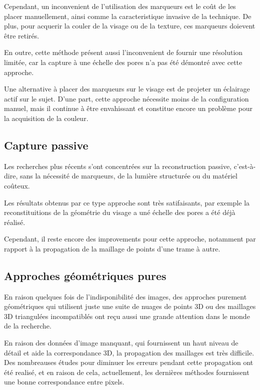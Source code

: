 \documentclass[a4paper,12pt]{article}
\begin{document}
Cependant, un inconvenient de l'utilisation des marqueurs est le coût
de les placer manuellement, ainsi comme la caracteristique invasive de
la technique. De plus, pour acquerir la couler de la visage ou de la
texture, ces marqueurs doievent être retirés. 

En outre, cette méthode présent aussi l'inconvenient de fournir une
résolution limitée, car la capture à une échelle des pores n'a pas été
démontré avec cette approche. 

Une alternative à placer des marqueurs sur le visage est de projeter
un éclairage actif sur le sujet. D'une part, cette approche nécessite
moins de la configuration manuel, mais il continue à être envahissant
et constitue encore un problème pour la acquisition de la couleur. 

\subsection*{Capture passive }

Les recherches plus récents s'ont concentrées sur la reconstruction
passive, c'est-à-dire, sans la nécessité de marqueurs, de la lumière
structurée ou du matériel coûteux. 

Les résultats obtenus par ce type approche sont très satifaisants, par
exemple la reconstituitions de la géométrie du visage a uné échelle
des pores a été déjà réalisé. 
 
Cependant, il reste encore des improvements pour cette approche,
notamment par rapport à la propagation de la maillage de points d'une
trame à autre. 

\subsection*{Approches géométriques pures}

En raison quelques fois de l'indisponibilité des images, des approches purement
géométriques qui utilisent juste une suite de nuages de points 3D ou
des maillages 3D triangulées incompatiblés ont reçu aussi une grande attention
dans le monde de la recherche.

En raison des données d'image manquant, qui fournissent un haut niveau
de détail et aide la correspondance 3D, la propagation des maillages 
est très difficile. Des nombreauses études pour diminuer les erreurs
pendant cette propagation ont été realisé, et en raison de cela,
actuellement, les dernières méthodes fournissent une bonne
correspondance entre pixels. %
\end{document}
